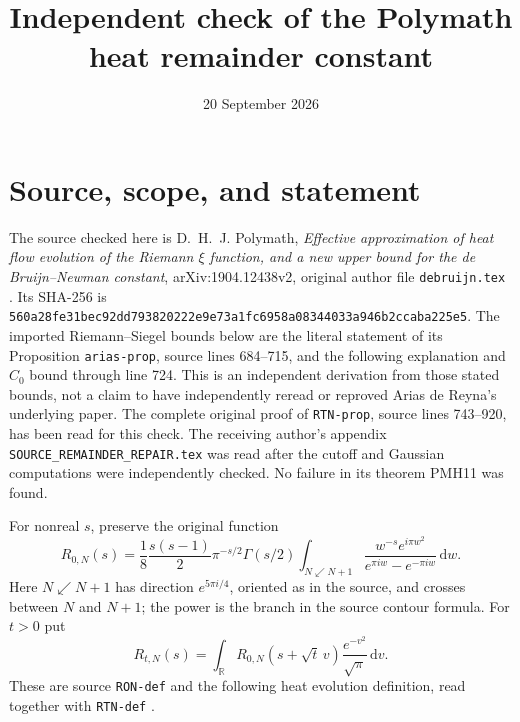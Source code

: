\documentclass[11pt]{article}
\title{Independent check of the Polymath heat remainder constant}
\date{20 September 2026}
\newcommand{\R}{\mathbb R}
\newcommand{\dd}{\,\mathrm d}
\begin{document}
\maketitle

\section{Source, scope, and statement}

The source checked here is D.~H.~J. Polymath,
\emph{Effective approximation of heat flow evolution of the Riemann
$\xi$ function, and a new upper bound for the de Bruijn--Newman
constant}, arXiv:1904.12438v2, original author file
\texttt{debruijn.tex} \cite{polymath}. Its SHA-256 is
\texttt{560a28fe31bec92dd793820222e9e73a1fc6958a08344033a946b2ccaba225e5}.
The imported Riemann--Siegel bounds below are the literal statement
of its Proposition \texttt{arias-prop}, source lines 684--715,
and the following explanation and $C_0$ bound through line 724.
This is an independent derivation from those stated bounds, not
a claim to have independently reread or reproved Arias de Reyna's
underlying paper. The complete original proof of
\texttt{RTN-prop}, source lines 743--920, has been read for this check.
The receiving author's appendix \texttt{SOURCE\_REMAINDER\_REPAIR.tex}
was read after the cutoff and Gaussian computations were independently
checked. No failure in its theorem PMH11 was found.

For nonreal $s$, preserve the original function
\begin{equation}\label{defR}
 R_{0,N}(s)=\frac18\frac{s(s-1)}2\pi^{-s/2}\Gamma(s/2)
 \int_{N\swarrow N+1}
 \frac{w^{-s}e^{i\pi w^2}}{e^{\pi iw}-e^{-\pi iw}}\dd w.
\end{equation}
Here $N\swarrow N+1$ has direction $e^{5\pi i/4}$, oriented as
in the source, and crosses between $N$ and $N+1$; the power is
the branch in the source contour formula. For $t>0$ put
\begin{equation}\label{heatR}
 R_{t,N}(s)=\int_\R R_{0,N}(s+\sqrt t\,v)
                      \frac{e^{-v^2}}{\sqrt\pi}\dd v.
\end{equation}
These are source \texttt{RON-def} and the following heat evolution
definition, read together with \texttt{RTN-def} \cite{polymath}.
\end{document}
